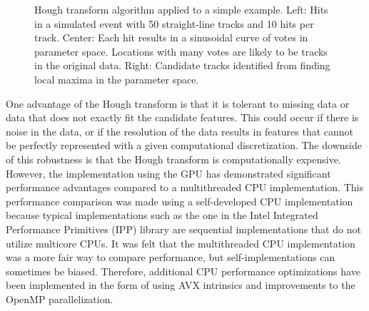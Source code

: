 \documentclass[preprint,sort&compress]{elsarticle}
\begin{document}
\begin{figure}[!Hhtb]
\begin{center}
  \caption{Hough transform algorithm applied to a simple example. Left: Hits in a simulated event with 50
    straight-line tracks and 10 hits per track. Center: Each hit results in a sinusoidal curve of votes in parameter
    space. Locations with many votes are likely to be tracks in the original data. Right:
    Candidate tracks identified from finding local maxima in the parameter space.\label{fig:hough}}
\end{center}
\end{figure}

One advantage of the Hough transform is that it is tolerant to missing data or data that does not exactly fit the candidate features.  This could occur if there is noise in the data, or if the resolution of the data results in features that cannot be perfectly represented with a given computational discretization.  The downside of this robustness is that the Hough transform is computationally expensive.  However, the implementation using the GPU has demonstrated significant performance advantages compared to a multithreaded CPU implementation.  This performance comparison was made using a self-developed CPU implementation because typical implementations such as the one in the Intel Integrated Performance Primitives (IPP) library are sequential implementations that do not utilize multicore CPUs.  It was felt that the multithreaded CPU implementation was a more fair way to compare performance, but self-implementations can sometimes be biased.  Therefore, additional CPU performance optimizations have been implemented in the form of using AVX intrinsics and improvements to the OpenMP parallelization.
\end{document}
